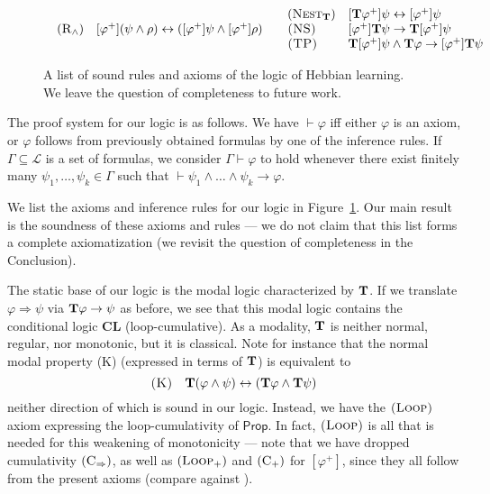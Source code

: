 \documentclass[letterpaper]{article}
\theoremstyle{definition}
\newcommand{\lang}{\mathcal{L}}
\newcommand{\proves}{\vdash}
\newcommand{\axiom}{\textsc}
\newcommand{\Typ}{\textrm{\textup{\textbf{T}}}}
\newcommand{\Prop}{\textsf{Prop}}
\begin{document}
\begin{figure}[ht!]
\begin{equation*}
{\begin{array}{ll}
\begin{array}{ll}
        (\axiom{R}_\land) & [\varphi^+] (\psi \land \rho) \leftrightarrow ([\varphi^+] \psi \land [\varphi^+] \rho)\\
    \end{array}
    &
    \begin{array}{ll}
        (\axiom{Nest}_\Typ) & [\Typ \varphi^+] \psi \leftrightarrow [\varphi^+] \psi \\
    
        \axiom{(NS)} & [\varphi^+] \Typ \psi \to \Typ [\varphi^+] \psi\\
        
        \axiom{(TP)} & \Typ [\varphi^+] \psi \land \Typ \varphi \to [\varphi^+] \Typ \psi\\
    \end{array}
    \\
\end{array}
}
\end{equation*}
\caption{A list of sound rules and axioms of the logic of Hebbian learning.  We leave the question of completeness to future work.}
\label{fig:proof-system}
\end{figure}

The proof system for our logic is as follows.  We have $\proves \varphi$ iff either $\varphi$ is an axiom, or $\varphi$ follows from previously obtained formulas by one of the inference rules.  If $\Gamma \subseteq \lang$ is a set of formulas, we consider $\Gamma \proves \varphi$ to hold whenever there exist finitely many $\psi_1, \ldots, \psi_k \in \Gamma$ such that $\proves \psi_1 \land \ldots \land \psi_k \to \varphi$.

We list the axioms and inference rules for our logic in Figure~\ref{fig:proof-system}.  Our main result is the soundness of these axioms and rules --- we do not claim that this list forms a complete axiomatization (we revisit the question of completeness in the Conclusion).

The static base of our logic is the modal logic characterized by $\Typ$.  If we translate $\varphi \Rightarrow \psi$ via $\Typ \varphi \to \psi$ as before, we see that this modal logic contains the conditional logic \textbf{CL} (loop-cumulative).  As a modality, $\Typ$ is neither normal, regular, nor monotonic, but it is classical.  Note for instance that the normal modal property \axiom{(K)} (expressed in terms of $\Typ$) is equivalent to
\[
\axiom{(K)} \quad \Typ (\varphi \land \psi) \leftrightarrow (\Typ \varphi \land \Typ \psi)
\]
neither direction of which is sound in our logic.  Instead, we have the $\axiom{(Loop)}$ axiom expressing the loop-cumulativity of $\Prop$.  In fact, $\axiom{(Loop)}$ is all that is needed for this weakening of monotonicity --- note that we have dropped cumulativity $(\axiom{C}_\Rightarrow)$, as well as $(\axiom{Loop}_+)$ and $(\axiom{C}_+)$ for $[\varphi^+]$, since they all follow from the present axioms (compare against \citep{kisby2022logic}).
\end{document}
